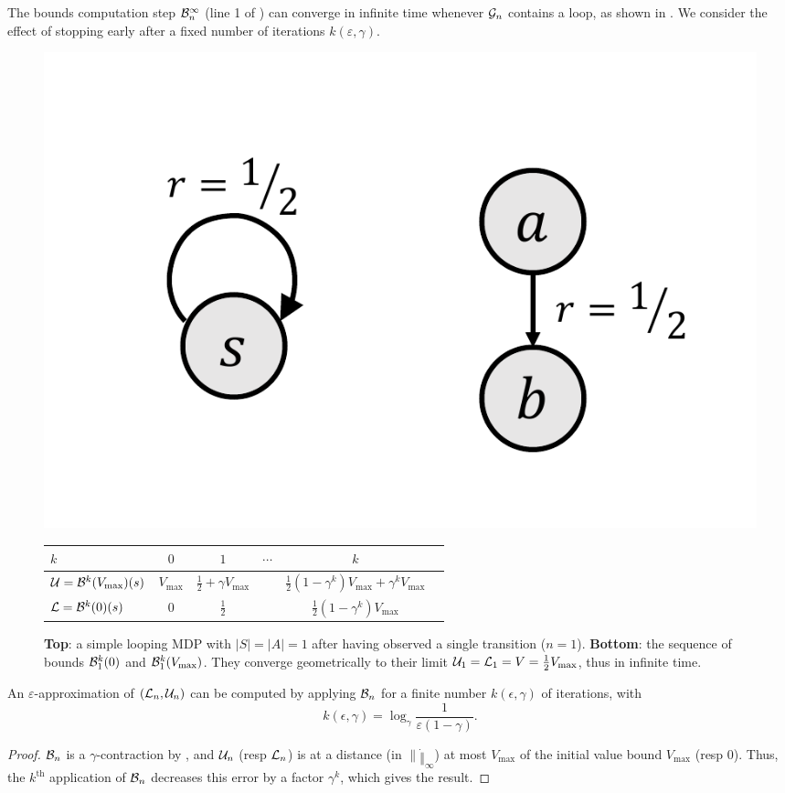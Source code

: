 The bounds computation step $\mathcal{B}_n^\infty$ (line 1 of \GBOPD) can converge in infinite time whenever $\mathcal{G}_n$ contains a loop, as shown in . We consider the effect of stopping early after a fixed number of iterations $k(\varepsilon,\gamma)$.

\begin{figure}[th]
	\centering
	\includegraphics[trim=2.5cm 1cm 9cm 2cm, clip, width=0.1\linewidth]{img/gbop/loop.pdf}\\
	\begin{tabular}{lccccc}
		\toprule
		$k$ & $0$ & $1$ & $\cdots$ & $k$ \\
		\midrule
		$\mathcal{U} = \mathcal{B}^k(V_{\max})(s)$ & $V_{\max}$ & $\frac{1}{2} + \gamma V_{\max}$ && $\frac{1}{2}(1-\gamma^k)V_{\max} + \gamma^k V_{\max}$\\
		$\mathcal{L} = \mathcal{B}^k(0)(s)$ & $0$ & $\frac{1}{2}$ && $\frac{1}{2}(1-\gamma^k)V_{\max}$\\
		\bottomrule
	\end{tabular}
	\caption{\textbf{Top}: a simple looping MDP with $|S|=|A|=1$ after having observed a single transition ($n=1$). \textbf{Bottom}: the sequence of bounds $\mathcal{B}_1^k(0)$ and $\mathcal{B}_1^k(V_{\max})$. They converge geometrically to their limit $\mathcal{U}_1 = \mathcal{L}_1 = V = \frac{1}{2}V_{\max}$, thus in infinite time.}
	\label{fig:simple_loop}
\end{figure}

\begin{proposition}
	\begin{leftbar}[propositionbar]
	An $\varepsilon$-approximation of $(\mathcal{L}_n, \mathcal{U}_n)$ can be computed by applying $\mathcal{B}_n$ for a finite number $k(\epsilon,\gamma)$ of iterations, with $$k(\epsilon,\gamma) = \log_\gamma\frac{1}{\varepsilon(1-\gamma)}.$$ 
	\end{leftbar}
\end{proposition}
\begin{proof}
	$\mathcal{B}_n$ is a $\gamma$-contraction by , and $\mathcal{U}_n$ (resp $\mathcal{L}_n$) is at a distance (in $\|\dot\|_\infty$) at most $V_{\max}$ of the initial value bound $V_{\max}$ (resp $0$). Thus, the $k^{\text{th}}$ application of $\mathcal{B}_n$ decreases this error by a factor $\gamma^k$, which gives the result.
	\end{proof}


